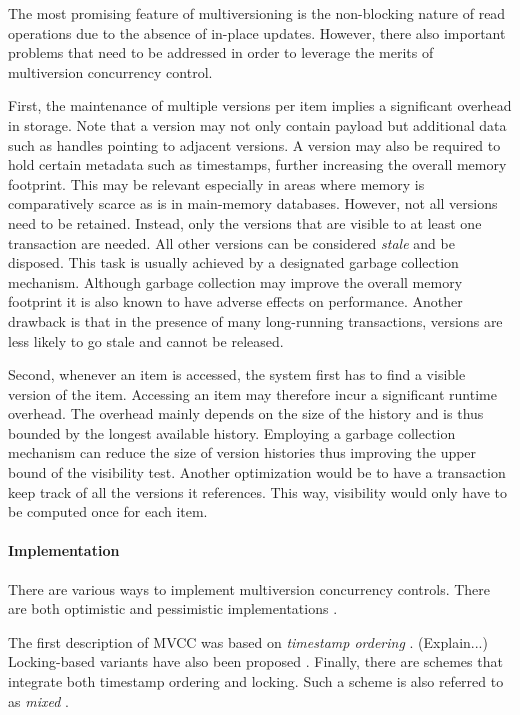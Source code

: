 The most promising feature of multiversioning is the non-blocking nature of read
operations due to the absence of in-place updates. However, there also important
problems that need to be addressed in order to leverage the merits of
multiversion concurrency control.

First, the maintenance of multiple versions per item implies a significant
overhead in storage. Note that a version may not only contain payload but
additional data such as handles pointing to adjacent versions. A version may
also be required to hold certain metadata such as timestamps, further increasing
the overall memory footprint. This may be relevant especially in areas where
memory is comparatively scarce as is in main-memory databases. However, not all
versions need to be retained. Instead, only the versions that are visible to at
least one transaction are needed. All other versions can be considered
\emph{stale} and be disposed. This task is usually achieved by a designated
garbage collection mechanism. Although garbage collection may improve the
overall memory footprint it is also known to have adverse effects on
performance. Another drawback is that in the presence of many long-running
transactions, versions are less likely to go stale and cannot be released.

Second, whenever an item is accessed, the system first has to find a visible
version of the item. Accessing an item may therefore incur a significant runtime
overhead. The overhead mainly depends on the size of the history and is thus
bounded by the longest available history. Employing a garbage collection
mechanism can reduce the size of version histories thus improving the upper
bound of the visibility test. Another optimization would be to have a
transaction keep track of all the versions it references. This way, visibility
would only have to be computed once for each item.

\paragraph{Implementation}

There are various ways to implement multiversion concurrency controls. There are
both optimistic and pessimistic implementations \cite{kung1981optimistic}.

The first description of MVCC was based on \textit{timestamp ordering}
\cite{reed1978naming}. (Explain...) Locking-based variants have also been
proposed \cite{bayer1980parallelism, bayer1980distributed,
stearns1981distributed}. Finally, there are schemes that integrate both
timestamp ordering and locking. Such a scheme is also referred to as
\textit{mixed} \cite{bernstein1983multiversion}.

